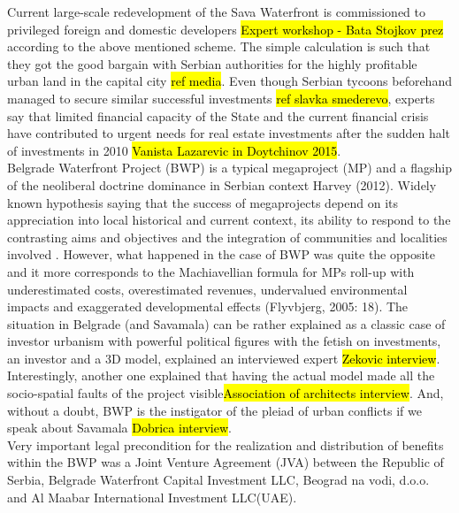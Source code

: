 \documentclass[11pt]{report}
\begin{document}
Current large-scale redevelopment of the Sava Waterfront is commissioned to privileged foreign and domestic developers
\hl{Expert workshop - Bata Stojkov prez} according to the above mentioned scheme.
The simple calculation is such that they got the good bargain with Serbian authorities for the highly profitable urban land in the capital city \hl{ref media}.
Even though Serbian tycoons beforehand managed to secure similar successful investments \hl{ref slavka smederevo}, experts say that limited financial capacity of the State and  the  current  financial  crisis  have  contributed  to urgent needs for real estate investments after the sudden halt of investments in 2010 \hl{Vanista Lazarevic in Doytchinov 2015}.
\\
Belgrade Waterfront Project (BWP) is a typical megaproject (MP) and a flagship of the neoliberal doctrine dominance in Serbian context Harvey (2012).
Widely known hypothesis saying that the success of megaprojects depend on its appreciation into local historical and current context, its ability to respond to the contrasting aims and objectives and the integration of communities and localities involved \cite{Hoyle 2000}.
However, what happened in the case of BWP was quite the opposite and it more corresponds to the Machiavellian formula for MPs roll-up with underestimated costs, overestimated
revenues, undervalued environmental impacts and exaggerated developmental effects (Flyvbjerg, 2005: 18).
The situation in Belgrade (and Savamala) can be rather explained as a classic case of investor urbanism with powerful political figures with the fetish on investments, an investor and a 3D model, explained an interviewed expert \hl{Zekovic interview}.
Interestingly, another one explained that having the actual model made all the socio-spatial faults of the project visible\footnotemark \hl{Association of architects interview}.
And, without a doubt, BWP is the instigator of the pleiad of urban conflicts if we speak about Savamala \hl{Dobrica interview}.
\\
Very important legal precondition for the realization and distribution of benefits within the BWP was a Joint Venture Agreement (JVA) between the Republic of Serbia, Belgrade Waterfront Capital Investment LLC, Beograd na vodi, d.o.o. and Al Maabar International Investment LLC\footnotemark (UAE).
\end{document}
